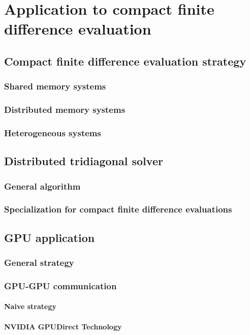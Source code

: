 \chapter{Application to compact finite difference evaluation}

\section{Compact finite difference evaluation strategy}
    \subsection{Shared memory systems}
    \subsection{Distributed memory systems}
    \subsection{Heterogeneous systems}

\section{Distributed tridiagonal solver}
    \subsection{General algorithm}
    \subsection{Specialization for compact finite difference
        evaluations}

\section{GPU application}
    \subsection{General strategy}
    \subsection{GPU-GPU communication}
        \subsubsection{Naive strategy}
        \subsubsection{NVIDIA GPUDirect Technology}
